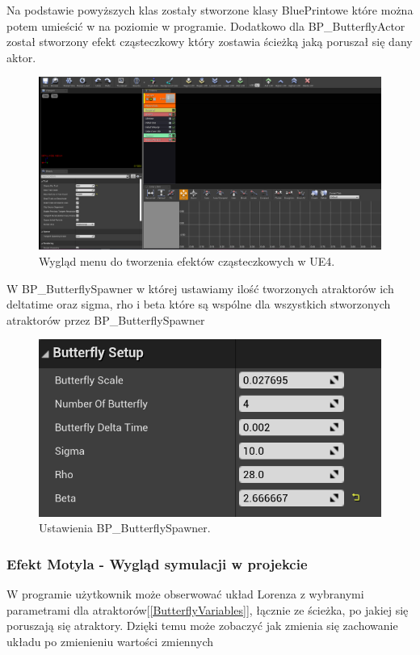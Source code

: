 \documentclass[a4paper,12pt,reqno]{article}
\begin{document}
Na podstawie powyższych klas zostały stworzone klasy BluePrintowe które można potem umieścić w na poziomie w programie. Dodatkowo dla BP\_ButterflyActor został stworzony efekt cząsteczkowy który zostawia ścieżką jaką poruszał się dany aktor.

\begin{figure}[H]%
\centering
\includegraphics[width=0.9\columnwidth]{graphics/butterfly/ButterflyParticleSystem.png}
\caption{Wygląd menu do tworzenia efektów cząsteczkowych w UE4. 
\label{BPExample}}%
%
\qquad
\end{figure} 


W BP\_ButterflySpawner w której ustawiamy ilość tworzonych atraktorów ich deltatime oraz sigma, rho i beta które są wspólne dla wszystkich stworzonych atraktorów przez BP\_ButterflySpawner

\begin{figure}[H]%
\centering
\includegraphics[width=0.7\columnwidth]{graphics/butterfly/ButterflySpawner.png}
\caption{Ustawienia BP\_ButterflySpawner.
\label{BPExample}}%
%
\qquad
\end{figure} 

\subsubsection{Efekt Motyla - Wygląd symulacji w projekcie}

W programie użytkownik może obserwować układ Lorenza z wybranymi parametrami dla atraktorów[\ref{ButterflyVariables}], łącznie ze ścieżka, po jakiej się poruszają się atraktory. Dzięki temu może zobaczyć jak zmienia się zachowanie układu po zmienieniu wartości zmiennych
\end{document}
